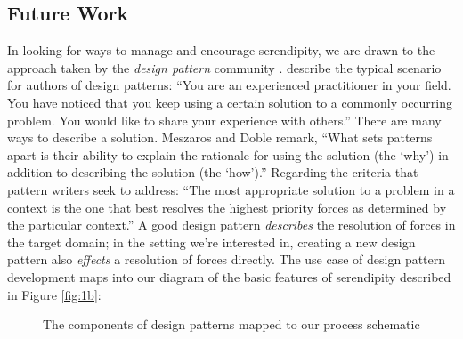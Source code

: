 \subsection{Future Work} \label{sec:futurework} \label{sec:hatching}

In looking for ways to manage and encourage serendipity, we are drawn
to the approach taken by the \emph{design pattern} community
\cite{alexander1999origins}.
 describe the typical scenario for authors of design
patterns: ``You are an experienced practitioner in your
field. You have noticed that you keep using a certain solution to a
commonly occurring problem. You would like to share your experience
with others.''  There are many ways to describe a solution.
Meszaros and Doble remark, ``What sets patterns apart is their
ability to explain the rationale for using the solution (the `why') in
addition to describing the solution (the `how').''  Regarding the
criteria that pattern writers seek to address: ``The most appropriate
solution to a problem in a context is the one that best resolves the
highest priority forces as determined by the particular context.'' 
%
%
A good design pattern \emph{describes} the resolution of forces in the
target domain; in the setting we're interested in, creating a new
design pattern also \emph{effects} a resolution of forces directly.
The use case of design pattern development maps into our diagram of
the basic features of serendipity described in Figure \ref{fig:1b}:

\begin{figure}

\caption{The components of design patterns mapped to our process schematic}
\end{figure}

